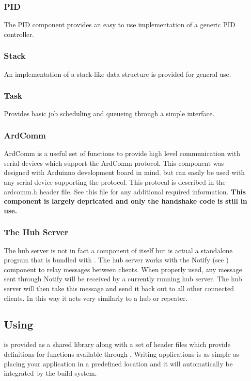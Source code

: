 \subsubsection{PID} \label{overviewpid}
The PID component provides an easy to use implementation of a generic PID
controller.

\subsubsection{Stack} \label{overviewstack}
An implementation of a stack-like data structure is provided for general use.

\subsubsection{Task} \label{overviewtask}
Provides basic job scheduling and queueing through a simple interface.

\subsubsection{ArdComm} \label{overviewardcomm}
ArdComm is a useful set of functions to provide high level communication with
serial devices which support the ArdComm protocol. This component was designed
with Arduinno development board in mind, but can easily be used with any serial
device supporting the protocol. This protocal is described in the ardcomm.h
header file. See this file for any additional required information. \textbf{This
  component is largely depricated and only the handshake code is still in use.}

\subsubsection{The Hub Server} \label{overviewhub}
The hub server is not in fact a component of \libseawolf{} itself but is actual a
standalone program that is bundled with \libseawolf{}. The hub server works with
the Notify (see ) component to relay messages
between clients. When properly used, any message sent through Notify will be
received by a currently running hub server. The hub server will then take this
message and send it back out to all other connected clients. In this way it acts
very similarly to a hub or repeater.

\subsection {Using \libseawolf} \label{usinglibseawolf}
\libseawolf{} is provided as a shared library along with a set of header files
 which provide definitions for functions available
through \libseawolf{}. Writing applications is as simple as placing your
application in a predefined location and it will automatically be integrated
by the build system.

